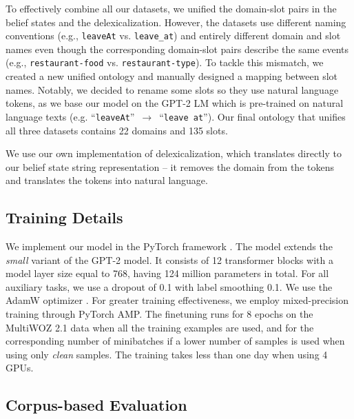 \documentclass[letterpaper]{article} %
\newcommand{\multiwozn}[0]{MultiWOZ 2.1 }
\newcommand{\code}[1]{\texttt{#1}}
\begin{document}
To effectively combine all our datasets, we unified the domain-slot pairs in the belief states and the delexicalization.
%
However, the datasets use different naming conventions (e.g., \code{leaveAt} vs. \code{leave\_at}) and entirely different domain and slot names even though the corresponding domain-slot pairs describe the same events (e.g., \code{restaurant-food} vs. \code{restaurant-type}). To tackle this mismatch, we created a new unified ontology and manually designed a mapping between slot names. Notably, we decided to rename some slots so they use natural language tokens, as we base our model on the GPT-2 LM which is pre-trained on natural language texts (e.g. ``\code{leaveAt}''~$\rightarrow$~``\code{leave at}'').
Our final ontology that unifies all three datasets contains 22 domains and 135 slots. %

We use our own implementation of delexicalization, which translates directly to our belief state string representation -- it removes the domain from the tokens and translates the tokens into natural language. 


\subsection{Training Details}

We implement our model in the PyTorch framework \cite{pytorch}.
The model extends the \emph{small} variant of the GPT-2 model.
It consists of 12 transformer blocks with a model layer size equal to 768, having 124 million parameters in total.
For all auxiliary tasks, we use a dropout of 0.1 with label smoothing 0.1.
We use the AdamW optimizer \cite{loshchilov2017decoupled}.
For greater training effectiveness, we employ mixed-precision training \cite{micikevicius2017} through PyTorch AMP. 
The finetuning runs for 8 epochs on the \multiwozn data when all the training examples are used, and for the corresponding number of minibatches if a lower number of samples is used when using only \emph{clean} samples.
The training takes less than one day when using 4 GPUs.

\subsection{Corpus-based Evaluation}
\end{document}
